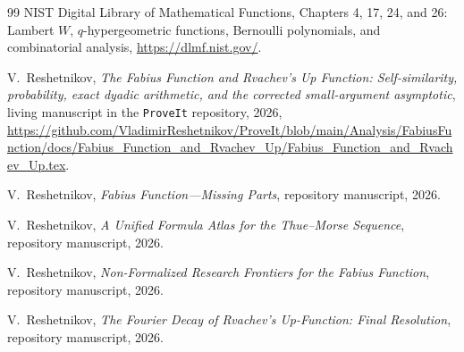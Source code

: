 \documentclass[11pt,oneside]{article}
\numberwithin{equation}{section}
\theoremstyle{definition}
\theoremstyle{remark}
\begin{document}
\begin{thebibliography}{99}
NIST Digital Library of Mathematical Functions,
\newblock Chapters 4, 17, 24, and 26: Lambert $W$, $q$-hypergeometric functions,
Bernoulli polynomials, and combinatorial analysis,
\newblock \url{https://dlmf.nist.gov/}.

V.~Reshetnikov,
\newblock \emph{The Fabius Function and Rvachev's Up Function: Self-similarity,
probability, exact dyadic arithmetic, and the corrected small-argument asymptotic},
\newblock living manuscript in the \texttt{ProveIt} repository, 2026,
\newblock \url{https://github.com/VladimirReshetnikov/ProveIt/blob/main/Analysis/FabiusFunction/docs/Fabius_Function_and_Rvachev_Up/Fabius_Function_and_Rvachev_Up.tex}.

V.~Reshetnikov,
\newblock \emph{Fabius Function---Missing Parts},
\newblock repository manuscript, 2026.

V.~Reshetnikov,
\newblock \emph{A Unified Formula Atlas for the Thue--Morse Sequence},
\newblock repository manuscript, 2026.

V.~Reshetnikov,
\newblock \emph{Non-Formalized Research Frontiers for the Fabius Function},
\newblock repository manuscript, 2026.

V.~Reshetnikov,
\newblock \emph{The Fourier Decay of Rvachev's Up-Function: Final Resolution},
\newblock repository manuscript, 2026.

\end{thebibliography}
\end{document}
